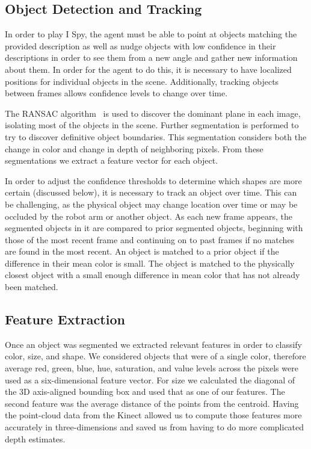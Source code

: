 \documentclass[11pt]{article}
\begin{document}
\subsection{Object Detection and Tracking}
In order to play I Spy, the agent must be able to point at objects matching the
provided description as well as nudge objects with low confidence in their
descriptions in order to see them from a new angle and gather new information
about them. In order for the agent to do this, it is necessary to have localized
positions for individual objects in the scene. Additionally, tracking objects
between frames allows confidence levels to change over time.

The RANSAC algorithm~\cite{fischler1981random} is used to discover the dominant
plane in each image, isolating most of the objects in the scene. Further
segmentation is performed to try to discover definitive object boundaries. This
segmentation considers both the change in color and change in depth of neighboring
pixels.
From these segmentations we extract a feature vector for each object.

In order to adjust the confidence thresholds to determine which shapes are more
certain (discussed below), it is necessary to track an object over time. This can
be challenging, as the physical object may change location over time or may be
occluded by the robot arm or another object. As each new frame appears, the
segmented objects in it are compared to prior segmented objects, beginning with
those of the most recent frame and continuing on to past frames if no matches are
found in the most recent. An object is matched to a prior object if the difference
in their mean color is small. The object is matched to the physically closest object
with a small enough difference in mean color that has not already been matched.

\subsection{Feature Extraction}

Once an object was segmented we extracted relevant features in order to classify
color, size, and shape. We considered objects that were of a single color, therefore
average red, green, blue, hue, saturation, and value levels across the pixels were
used as a six-dimensional feature vector. For size we calculated the diagonal of the 3D
axis-aligned bounding box and used that as one of our features. The second feature was
the average distance of the points from the centroid. Having the point-cloud data from
the Kinect allowed us to compute those features more accurately in three-dimensions
and saved us from having to do more complicated depth estimates.
\end{document}

